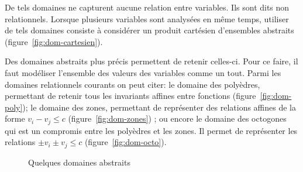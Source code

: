 De tels domaines ne capturent aucune relation entre variables. Ils sont dits non
relationnels. Lorsque plusieurs variables sont analysées en même temps, utiliser
de tels domaines consiste à considérer un produit cartésien d'ensembles
abstraits (figure~\ref{fig:dom-cartesien}).

Des domaines abstraits plus précis permettent de retenir celles-ci. Pour ce
faire, il faut modéliser l'ensemble des valeurs des variables comme un tout.
Parmi les domaines relationnels courants on peut citer: le domaine des
polyèdres, permettant de retenir tous les invariants affines entre fonctions
(figure~\ref{fig:dom-poly}); le domaine des zones, permettant de représenter
des relations affines de la forme $v_i - v_j \le c$ (figure~\ref{fig:dom-zones})
; ou encore le domaine des octogones qui est un compromis entre les polyèdres et
les zones. Il permet de représenter les relations $\pm v_i \pm v_j \le c$
(figure~\ref{fig:dom-octo}).

\begin{figure}[b]%

  \centering

  \subbottom[Domaine des polyèdres]{%
\label{fig:dom-poly}
%
    \begin{tikzpicture}[scale=0.5]
    \path[use as bounding box] (0,0) rectangle (8, 6);
%
    \draw[fill=red!30] (1,2) -- (2,4) -- (4,5) -- (6,5) -- (7,3) -- (5,1) -- cycle;
%
    \end{tikzpicture}
  }%

  \subbottom[Domaine des zones]{%
\label{fig:dom-zones}
%
    \begin{tikzpicture}
    \path[use as bounding box] (0,0) rectangle (4,4);
%
    \draw[fill=red!30] (1,2) -- (2,3) -- (3,3) -- (3,2) -- (2,1) -- (1,1) -- cycle;
%
    \end{tikzpicture}
  }%
  \subbottom[Domaine des octaèdres]{%
\label{fig:dom-octo}
%
    \begin{tikzpicture}
    \path[use as bounding box] (0,0) rectangle (4,4);
%
    \draw[fill=red!30] (1,1.5) -- (1,2) -- (2,3) -- (2.5,3) -- (3,2.5) -- (3,2) -- (2,1) -- (1.5,1) -- cycle;
%
    \end{tikzpicture}
  }%

  \caption{Quelques domaines abstraits}
\label{fig:dom-abstraits}
\end{figure}%

